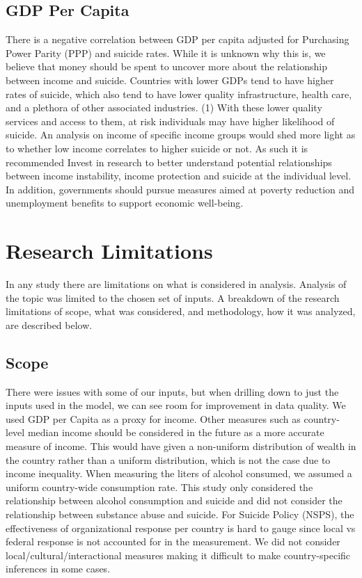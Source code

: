 \documentclass[]{article}
\begin{document}
\subsection{GDP Per Capita}\label{gdp-per-capita}

There is a negative correlation between GDP per capita adjusted for
Purchasing Power Parity (PPP) and suicide rates. While it is unknown why
this is, we believe that money should be spent to uncover more about the
relationship between income and suicide. Countries with lower GDPs tend
to have higher rates of suicide, which also tend to have lower quality
infrastructure, health care, and a plethora of other associated
industries. (1) With these lower quality services and access to them, at
risk individuals may have higher likelihood of suicide. An analysis on
income of specific income groups would shed more light as to whether low
income correlates to higher suicide or not. As such it is recommended
Invest in research to better understand potential relationships between
income instability, income protection and suicide at the individual
level. In addition, governments should pursue measures aimed at poverty
reduction and unemployment benefits to support economic well-being.

\section{Research Limitations}\label{research-limitations}

In any study there are limitations on what is considered in analysis.
Analysis of the topic was limited to the chosen set of inputs. A
breakdown of the research limitations of scope, what was considered, and
methodology, how it was analyzed, are described below.

\subsection{Scope}\label{scope}

There were issues with some of our inputs, but when drilling down to
just the inputs used in the model, we can see room for improvement in
data quality. We used GDP per Capita as a proxy for income. Other
measures such as country-level median income should be considered in the
future as a more accurate measure of income. This would have given a
non-uniform distribution of wealth in the country rather than a uniform
distribution, which is not the case due to income inequality. When
measuring the liters of alcohol consumed, we assumed a uniform
country-wide consumption rate. This study only considered the
relationship between alcohol consumption and suicide and did not
consider the relationship between substance abuse and suicide. For
Suicide Policy (NSPS), the effectiveness of organizational response per
country is hard to gauge since local vs federal response is not
accounted for in the measurement. We did not consider
local/cultural/interactional measures making it difficult to make
country-specific inferences in some cases.
\end{document}
